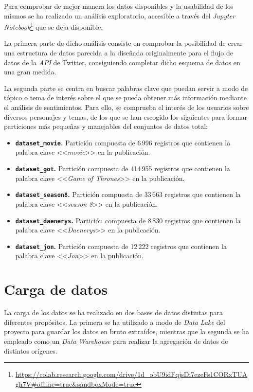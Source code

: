 Para comprobar de mejor manera los datos disponibles y la usabilidad de los mismos se ha realizado un análisis exploratorio, accesible a través del \textit{Jupyter Notebook}\footnote{\url{https://colab.research.google.com/drive/1d_obU9idFqjsDi7ezeFs1CORxTUAgh7V\#offline=true&sandboxMode=true}} que se deja disponible.

La primera parte de dicho análisis consiste en comprobar la posibilidad de crear una estructura de datos parecida a la diseñada originalmente para el flujo de datos de la \textit{API} de Twitter, consiguiendo completar dicho esquema de datos en una gran medida.

La segunda parte se centra en buscar palabras clave que puedan servir a modo de tópico o tema de interés sobre el que se pueda obtener más información mediante el análisis de sentimientos. Para ello, se comprueba el interés de los usuarios sobre diversos personajes y temas, de los que se han escogido los siguientes para formar particiones más pequeñas y manejables del conjuntos de datos total:

\begin{itemize}
    \item \textbf{\texttt{dataset\_movie}.} Partición compuesta de 6\,996 registros que contienen la palabra clave <<\textit{movie}>> en la publicación.
    \item \textbf{\texttt{dataset\_got}.} Partición compuesta de 414\,955 registros que contienen la palabra clave <<\textit{Game of Thrones}>> en la publicación.
    \item \textbf{\texttt{dataset\_season8}.} Partición compuesta de 33\,663 registros que contienen la palabra clave <<\textit{season 8}>> en la publicación.
    \item \textbf{\texttt{dataset\_daenerys}.} Partición compuesta de 8\,830 registros que contienen la palabra clave <<\textit{Daenerys}>> en la publicación.
    \item \textbf{\texttt{dataset\_jon}.} Partición compuesta de 12\,222 registros que contienen la palabra clave <<\textit{Jon}>> en la publicación.
\end{itemize}

\section{Carga de datos}

La carga de los datos se ha realizado en dos bases de datos distintas para diferentes propósitos. La primera se ha utilizado a modo de \textit{Data Lake} del proyecto para guardar los datos en bruto extraídos, mientras que la segunda se ha empleado como un \textit{Data Warehouse} para realizar la agregación de datos de distintos orígenes.

